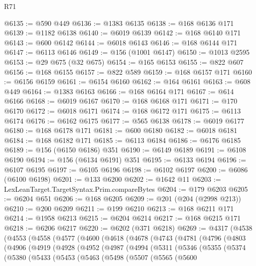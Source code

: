 \begin{lexlean}{R71}
\begin{coremodule}
@6135 := @590 @449
@6136 := @1383 @6135
@6138 := @168 @6136 @171
@6139 := @1182 @6138
@6140 := @6019 @6139
@6142 := @168 @6140 @171
@6143 := @600 @6142
@6144 := @6018 @6143
@6146 := @168 @6144 @171
@6147 := @6113 @6146
@6149 := @156 (@1001 @6147)
@6150 := @1013 @2595
@6153 := @29 @675 (@32 @675)
@6154 := @165 @6153
@6155 := @822 @607
@6156 := @168 @6155
@6157 := @822 @589
@6159 := @168 @6157 @171
@6160 := @6156 @6159
@6161 := @6154 @6160
@6162 := @164 @6161
@6163 := @608 @449
@6164 := @1383 @6163
@6166 := @168 @6164 @171
@6167 := @614 @6166
@6168 := @6019 @6167
@6170 := @168 @6168 @171
@6171 := @170 @6170
@6172 := @6018 @6171
@6174 := @168 @6172 @171
@6175 := @6113 @6174
@6176 := @6162 @6175
@6177 := @565 @6138
@6178 := @6019 @6177
@6180 := @168 @6178 @171
@6181 := @600 @6180
@6182 := @6018 @6181
@6184 := @168 @6182 @171
@6185 := @6113 @6184
@6186 := @6176 @6185
@6189 := @156 (@6150 @6186) @351
@6190 := @6149 @6189
@6191 := @6108 @6190
@6194 := @156 (@6134 @6191) @351
@6195 := @6133 @6194
@6196 := @6107 @6195
@6197 := @6105 @6196
@6198 := @6102 @6197
@6200 := @6086 (@6100 @6198)
@6201 := @133 @6200
@6202 := @1642 @11
@6203 := LexLeanTarget.TargetSyntax.Prim.compareBytes
@6204 := @179 @6203
@6205 := @6204 @651
@6206 := @168 @6205
@6209 := @201 (@204 (@2998 @213))
@6210 := @200 @6209
@6211 := @199 @6210
@6213 := @168 @6211 @171
@6214 := @1958 @6213
@6215 := @6204 @6214
@6217 := @168 @6215 @171
@6218 := @6206 @6217
@6220 := @6202 (@371 @6218)
@6269 := @4317
    (@4538
      (@4553
        (@4558
          (@4577
            (@4600
              (@4618
                (@4678
                  (@4743
                    (@4781
                      (@4796
                        (@4803
                          (@4906
                            (@4919
                              (@4928
                                (@4952
                                  (@4987
                                    (@4994
                                      (@5311
                                        (@5346
                                          (@5355
                                            (@5374
                                              (@5380
                                                (@5433
                                                  (@5453
                                                    (@5463
                                                      (@5498
                                                        (@5507
                                                          (@5565
                                                            (@5600

\end{coremodule}
\end{lexlean}
